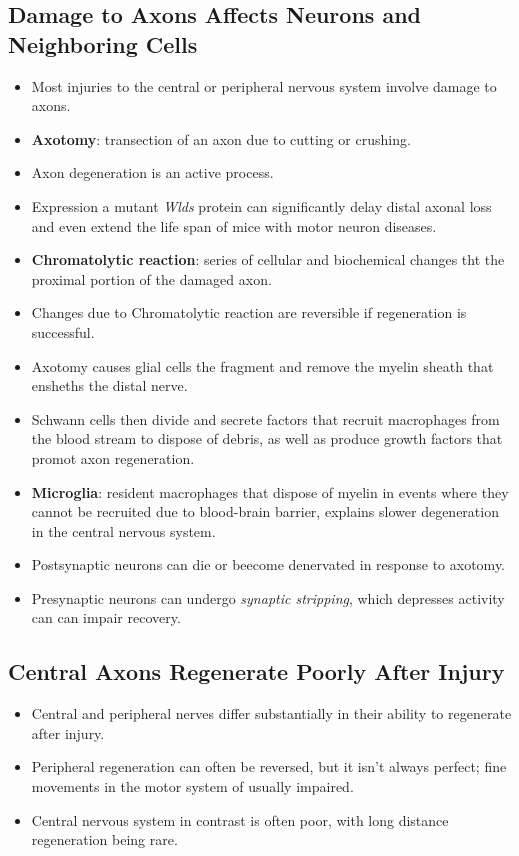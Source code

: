\documentclass[12pt,a4paper]{article}
\begin{document}
\subsection{Damage to Axons Affects Neurons and Neighboring Cells}
\begin{itemize}
    \item Most injuries to the central or peripheral nervous system involve damage to axons.
    \item \textbf{Axotomy}: transection of an axon due to cutting or crushing.
    \item Axon degeneration is an active process.
    \item Expression a mutant \textit{Wlds} protein can significantly delay distal axonal loss and even extend the life span of mice with motor neuron diseases.
    \item \textbf{Chromatolytic reaction}: series of cellular and biochemical changes tht the proximal portion of the damaged axon.
    \item Changes due to Chromatolytic reaction are reversible if regeneration is successful.
    \item Axotomy causes glial cells the fragment and remove the myelin sheath that ensheths the distal nerve.
    \item Schwann cells then divide and secrete factors that recruit macrophages from the blood stream to dispose of debris, as well as produce growth factors that promot axon regeneration.
    \item \textbf{Microglia}: resident macrophages that dispose of myelin in events where they cannot be recruited due to blood-brain barrier, explains slower degeneration in the central nervous system.
    \item Postsynaptic neurons can die or beecome denervated in response to axotomy.
    \item Presynaptic neurons can undergo \textit{synaptic stripping}, which depresses activity can can impair recovery.
\end{itemize}

\subsection{Central Axons Regenerate Poorly After Injury}
\begin{itemize}
    \item Central and peripheral nerves differ substantially in their ability to regenerate after injury.
    \item Peripheral regeneration can often be reversed, but it isn't always perfect; fine movements in the motor system of usually impaired.
    \item Central nervous system in contrast is often poor, with long distance regeneration being rare.
\end{itemize}
\end{document}
